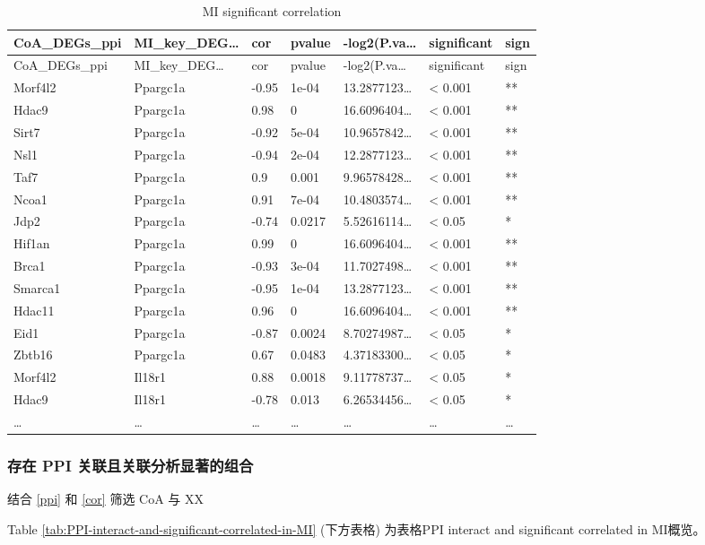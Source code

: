 \documentclass[
]{article}
\begin{document}
\begin{longtable}[]{@{}lllllll@{}}
\caption{\label{tab:MI-significant-correlation}MI significant correlation}\tabularnewline
\toprule
CoA\_DEGs\_ppi & MI\_key\_DEG\ldots{} & cor & pvalue & -log2(P.va\ldots{} & significant & sign\tabularnewline
\midrule
\endfirsthead
\toprule
CoA\_DEGs\_ppi & MI\_key\_DEG\ldots{} & cor & pvalue & -log2(P.va\ldots{} & significant & sign\tabularnewline
\midrule
\endhead
Morf4l2 & Ppargc1a & -0.95 & 1e-04 & 13.2877123\ldots{} & \textless{} 0.001 & **\tabularnewline
Hdac9 & Ppargc1a & 0.98 & 0 & 16.6096404\ldots{} & \textless{} 0.001 & **\tabularnewline
Sirt7 & Ppargc1a & -0.92 & 5e-04 & 10.9657842\ldots{} & \textless{} 0.001 & **\tabularnewline
Nsl1 & Ppargc1a & -0.94 & 2e-04 & 12.2877123\ldots{} & \textless{} 0.001 & **\tabularnewline
Taf7 & Ppargc1a & 0.9 & 0.001 & 9.96578428\ldots{} & \textless{} 0.001 & **\tabularnewline
Ncoa1 & Ppargc1a & 0.91 & 7e-04 & 10.4803574\ldots{} & \textless{} 0.001 & **\tabularnewline
Jdp2 & Ppargc1a & -0.74 & 0.0217 & 5.52616114\ldots{} & \textless{} 0.05 & *\tabularnewline
Hif1an & Ppargc1a & 0.99 & 0 & 16.6096404\ldots{} & \textless{} 0.001 & **\tabularnewline
Brca1 & Ppargc1a & -0.93 & 3e-04 & 11.7027498\ldots{} & \textless{} 0.001 & **\tabularnewline
Smarca1 & Ppargc1a & -0.95 & 1e-04 & 13.2877123\ldots{} & \textless{} 0.001 & **\tabularnewline
Hdac11 & Ppargc1a & 0.96 & 0 & 16.6096404\ldots{} & \textless{} 0.001 & **\tabularnewline
Eid1 & Ppargc1a & -0.87 & 0.0024 & 8.70274987\ldots{} & \textless{} 0.05 & *\tabularnewline
Zbtb16 & Ppargc1a & 0.67 & 0.0483 & 4.37183300\ldots{} & \textless{} 0.05 & *\tabularnewline
Morf4l2 & Il18r1 & 0.88 & 0.0018 & 9.11778737\ldots{} & \textless{} 0.05 & *\tabularnewline
Hdac9 & Il18r1 & -0.78 & 0.013 & 6.26534456\ldots{} & \textless{} 0.05 & *\tabularnewline
\ldots{} & \ldots{} & \ldots{} & \ldots{} & \ldots{} & \ldots{} & \ldots{}\tabularnewline
\bottomrule
\end{longtable}

\hypertarget{ux5b58ux5728-ppi-ux5173ux8054ux4e14ux5173ux8054ux5206ux6790ux663eux8457ux7684ux7ec4ux5408}{%
\subsubsection{存在 PPI 关联且关联分析显著的组合}\label{ux5b58ux5728-ppi-ux5173ux8054ux4e14ux5173ux8054ux5206ux6790ux663eux8457ux7684ux7ec4ux5408}}

结合 \ref{ppi} 和 \ref{cor} 筛选 CoA 与 XX

Table \ref{tab:PPI-interact-and-significant-correlated-in-MI} (下方表格) 为表格PPI interact and significant correlated in MI概览。
\end{document}

